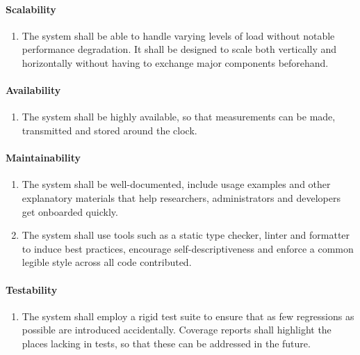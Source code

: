 \paragraph{Scalability}
\begin{enumerate}[resume, font=\sffamily, label={\textbf{NFR-\protect\twodigits{\theenumi}}},leftmargin=1.7cm, ref=NFR-\protect\twodigits{\theenumi}]
	\item The system shall be able to handle varying levels of load without notable performance degradation. It shall be designed to scale both vertically and horizontally without having to exchange major components beforehand.\label{itm:nfr-scalability}
\end{enumerate}

\paragraph{Availability}
\begin{enumerate}[resume, font=\sffamily, label={\textbf{NFR-\protect\twodigits{\theenumi}}},leftmargin=1.7cm, ref=NFR-\protect\twodigits{\theenumi}]
	\item The system shall be highly available, so that measurements can be made, transmitted and stored around the clock.\label{itm:nfr-availability}
\end{enumerate}

\paragraph{Maintainability}
\begin{enumerate}[resume, font=\sffamily, label={\textbf{NFR-\protect\twodigits{\theenumi}}},leftmargin=1.7cm, ref=NFR-\protect\twodigits{\theenumi}]
	\item The system shall be well-documented, include usage examples and other explanatory materials that help researchers, administrators and developers get onboarded quickly.\label{itm:nfr-maintainability-documentation}
	\item The system shall use tools such as a static type checker, linter and formatter to induce best practices, encourage self-descriptiveness and enforce a common legible style across all code contributed.\label{itm:nfr-maintainability-tools}
\end{enumerate}

\paragraph{Testability}
\begin{enumerate}[resume, font=\sffamily, label={\textbf{NFR-\protect\twodigits{\theenumi}}},leftmargin=1.7cm, ref=NFR-\protect\twodigits{\theenumi}]
	\item The system shall employ a rigid test suite to ensure that as few regressions as possible are introduced accidentally. Coverage reports shall highlight the places lacking in tests, so that these can be addressed in the future.\label{itm:nfr-testability}
\end{enumerate}

